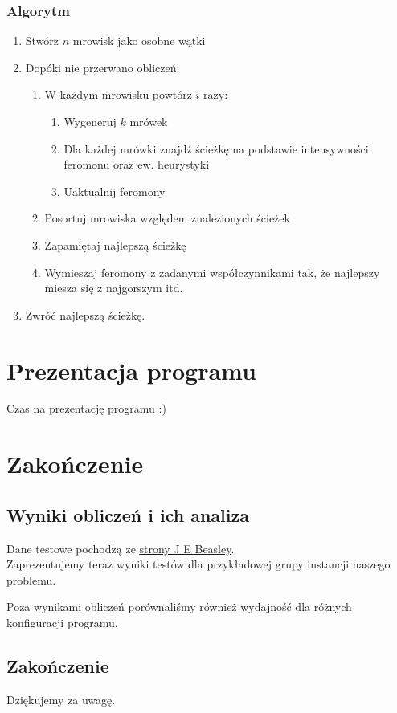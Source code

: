 \documentclass[11pt,a4paper]{beamer}
\begin{document}
\begin{frame}
\frametitle{Algorytm}
\begin{enumerate}
\item Stwórz $n$ mrowisk jako osobne wątki
\item Dopóki nie przerwano obliczeń:

\begin{enumerate}
\item W każdym mrowisku powtórz $i$ razy:

\begin{enumerate}
	\item Wygeneruj $k$ mrówek
	\item Dla każdej mrówki znajdź ścieżkę na podstawie intensywności feromonu oraz ew. heurystyki
	\item Uaktualnij feromony
\end{enumerate}

\item Posortuj mrowiska względem znalezionych ścieżek
\item Zapamiętaj najlepszą ścieżkę
\item Wymieszaj feromony z zadanymi współczynnikami tak, że najlepszy miesza się z najgorszym itd.
\end{enumerate}
\item Zwróć najlepszą ścieżkę.
\end{enumerate}
\end{frame}

\section{Prezentacja programu}
\begin{frame}[c]
\begin{center}
Czas na prezentację programu :)
\end{center}
\end{frame}


\section{Zakończenie}
\subsection{Wyniki obliczeń i ich analiza}
\begin{frame}
Dane testowe pochodzą ze \href{http://people.brunel.ac.uk/~mastjjb/jeb/orlib/wtinfo.html}{\color{blue}\underline{strony J E Beasley}}.\\

Zaprezentujemy teraz wyniki testów dla przykładowej grupy instancji naszego problemu.

Poza wynikami obliczeń porównaliśmy również wydajność dla różnych konfiguracji programu.
\end{frame}

\subsection{Zakończenie}
\begin{frame}
\begin{center}
Dziękujemy za uwagę.
\end{center}
\end{frame}
\end{document}
